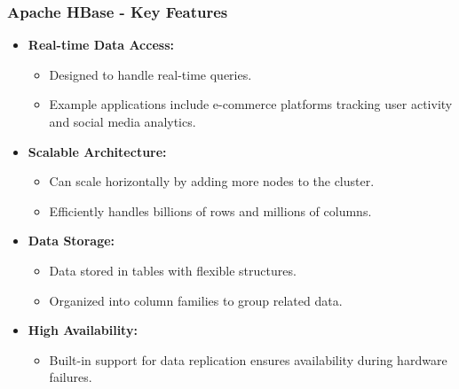 \documentclass[aspectratio=169]{beamer}
\begin{document}
\begin{frame}[fragile]
    \frametitle{Apache HBase - Key Features}
    \begin{itemize}
        \item \textbf{Real-time Data Access:}
        \begin{itemize}
            \item Designed to handle real-time queries.
            \item Example applications include e-commerce platforms tracking user activity and social media analytics.
        \end{itemize}
        
        \item \textbf{Scalable Architecture:}
        \begin{itemize}
            \item Can scale horizontally by adding more nodes to the cluster.
            \item Efficiently handles billions of rows and millions of columns.
        \end{itemize}
        
        \item \textbf{Data Storage:}
        \begin{itemize}
            \item Data stored in tables with flexible structures.
            \item Organized into column families to group related data.
        \end{itemize}
        
        \item \textbf{High Availability:}
        \begin{itemize}
            \item Built-in support for data replication ensures availability during hardware failures.
        \end{itemize}
    \end{itemize}
\end{frame}
\end{document}
